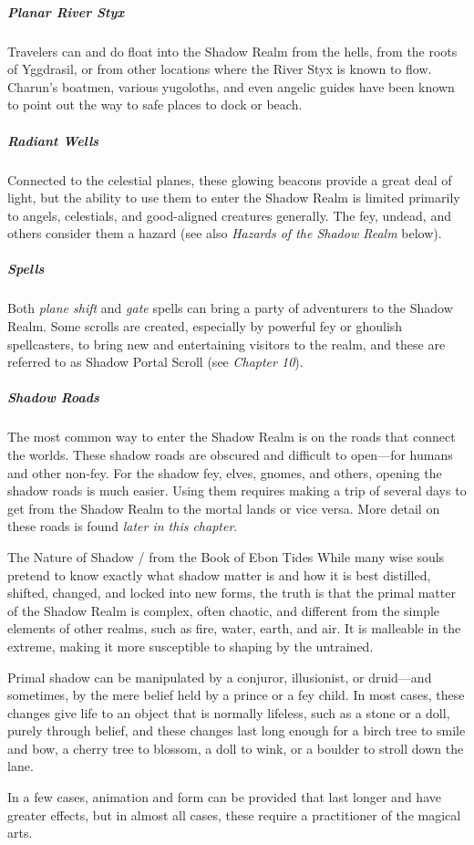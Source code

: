 \documentclass[10pt,a4paper,twoside,bg=print,twocolumn,openany,nodeprecatedcode]{dndbook}
\begin{document}
\subparagraph{Planar River Styx}
Travelers can and do float into the Shadow Realm from the hells, from the roots of Yggdrasil, or from other locations where the River Styx is known to flow. Charun's boatmen, various yugoloths, and even angelic guides have been known to point out the way to safe places to dock or beach.

\subparagraph{Radiant Wells}
Connected to the celestial planes, these glowing beacons provide a great deal of light, but the ability to use them to enter the Shadow Realm is limited primarily to angels, celestials, and good-aligned creatures generally. The fey, undead, and others consider them a hazard (see also \textit{Hazards of the Shadow Realm} below).

\subparagraph{Spells}
Both \textit{plane shift} and \textit{gate} spells can bring a party of adventurers to the Shadow Realm. Some scrolls are created, especially by powerful fey or ghoulish spellcasters, to bring new and entertaining visitors to the realm, and these are referred to as Shadow Portal Scroll (see \textit{Chapter 10}).

\subparagraph{Shadow Roads}
The most common way to enter the Shadow Realm is on the roads that connect the worlds. These shadow roads are obscured and difficult to open—for humans and other non-fey. For the shadow fey, elves, gnomes, and others, opening the shadow roads is much easier. Using them requires making a trip of several days to get from the Shadow Realm to the mortal lands or vice versa. More detail on these roads is found \textit{later in this chapter}.

\begin{DndSidebar}[float=!b]{The Nature of Shadow / from the Book of Ebon Tides}
While many wise souls pretend to know exactly what shadow matter is and how it is best distilled, shifted, changed, and locked into new forms, the truth is that the primal matter of the Shadow Realm is complex, often chaotic, and different from the simple elements of other realms, such as fire, water, earth, and air. It is malleable in the extreme, making it more susceptible to shaping by the untrained.



Primal shadow can be manipulated by a conjuror, illusionist, or druid—and sometimes, by the mere belief held by a prince or a fey child. In most cases, these changes give life to an object that is normally lifeless, such as a stone or a doll, purely through belief, and these changes last long enough for a birch tree to smile and bow, a cherry tree to blossom, a doll to wink, or a boulder to stroll down the lane.



In a few cases, animation and form can be provided that last longer and have greater effects, but in almost all cases, these require a practitioner of the magical arts.



\end{DndSidebar}
\end{document}

